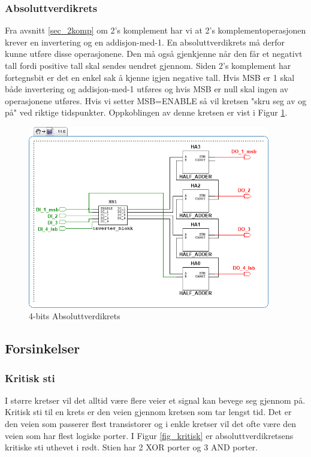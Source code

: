 \documentclass[11pt, a4paper, norwegian]{article}
\begin{document}
\subsubsection{Absoluttverdikrets}
Fra avsnitt \ref{sec_2komp} om 2's komplement har vi at 2's komplementoperasjonen krever en invertering og en addisjon-med-1. En absoluttverdikrets må derfor kunne utføre disse operasjonene. Den må også gjenkjenne når den får et negativt tall fordi positive tall skal sendes uendret gjennom. Siden 2's komplement har fortegnsbit er det en enkel sak å kjenne igjen negative tall. Hvis MSB er 1 skal både invertering og addisjon-med-1 utføres og hvis MSB er null skal ingen av operasjonene utføres. Hvis vi setter MSB=ENABLE så vil kretsen "skru seg av og på" ved riktige tidspunkter. 
Oppkoblingen av denne kretsen er vist i Figur \ref{fig_abstractFull}. 

\begin{figure}[h]
  \caption{4-bits Absoluttverdikrets}
  \label{fig_abstractFull}
  \centerline{\includegraphics[width=300pt]{4bit_absoluttverdikrets_abstract.png}}
\end{figure}



\subsection{Forsinkelser}
\subsubsection{Kritisk sti}
I større kretser vil det alltid være flere veier et signal kan bevege seg gjennom på. Kritisk sti til en krets er den veien gjennom kretsen som tar lengst tid. Det er den veien som passerer flest transistorer og i enkle kretser vil det ofte være den veien som har flest logiske porter. 
I Figur \ref{fig_kritisk} er absoluttverdikretsens kritiske sti uthevet i rødt. Stien har 2 XOR porter og 3 AND porter.  
\end{document}
